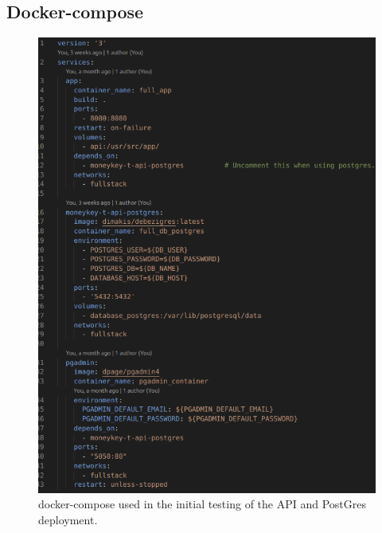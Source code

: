 	\subsection{Docker-compose}
    \begin{figure} [ht]
        \begin{center}
            \includegraphics[width=.7\textwidth]{figures/docker-compose.png}
            \caption{docker-compose used in the initial testing of the API and PostGres deployment.}
            \label{fig: A.2}
        \end{center}
    \end{figure}
